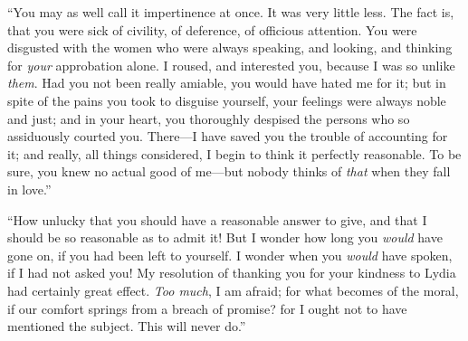 
“You may as well call it impertinence at once. It was very little less. The fact is, that you were sick of civility, of deference, of officious attention. You were disgusted with the women who were always speaking, and looking, and thinking for {\em your} approbation alone. I roused, and interested you, because I was so unlike {\em them}. Had you not been really amiable, you would have hated me for it; but in spite of the pains you took to disguise yourself, your feelings were always noble and just; and in your heart, you thoroughly despised the persons who so assiduously courted you. There---I have saved you the trouble of accounting for it; and really, all things considered, I begin to think it perfectly reasonable. To be sure, you knew no actual good of me---but nobody thinks of {\em that} when they fall in love.”








“How unlucky that you should have a reasonable answer to give, and that I should be so reasonable as to admit it! But I wonder how long you {\em would} have gone on, if you had been left to yourself. I wonder when you {\em would} have spoken, if I had not asked you! My resolution of thanking you for your kindness to Lydia had certainly great effect. {\em Too much}, I am afraid; for what becomes of the moral, if our comfort springs from a breach of promise? for I ought not to have mentioned the subject. This will never do.”

